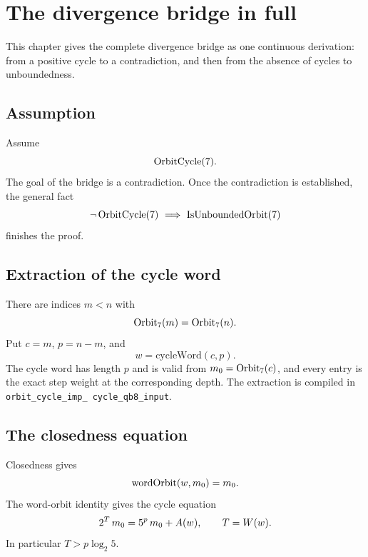 \section{The divergence bridge in full}

This chapter gives the complete divergence bridge as one continuous
derivation: from a positive cycle to a contradiction, and then from
the absence of cycles to unboundedness.

\subsection{Assumption}

Assume
\begin{equation*}
  \mathrm{OrbitCycle}(7).
\end{equation*}
The goal of the bridge is a contradiction.  Once the contradiction is
established, the general fact
\begin{equation*}
  \neg\,\OrbitCycle(7)\ \Longrightarrow\ \mathrm{IsUnboundedOrbit}(7)
\end{equation*}
finishes the proof.

\subsection{Extraction of the cycle word}

There are indices $m<n$ with
\begin{equation*}
  \mathrm{Orbit}_7(m)=\mathrm{Orbit}_7(n).
\end{equation*}
Put $c=m$, $p=n-m$, and
\begin{equation*}
  w=\mathrm{cycleWord}(c,p).
\end{equation*}
The cycle word has length $p$ and is valid from $m_0=\mathrm{Orbit}_7(c)$,
and every entry is the exact step weight at the corresponding depth.
The extraction is compiled in
\texttt{orbit\_\allowbreak cycle\_\allowbreak imp\_\allowbreak
cycle\_\allowbreak qb8\_\allowbreak input}.

\subsection{The closedness equation}

Closedness gives
\begin{equation*}
  \mathrm{wordOrbit}(w,m_0)=m_0.
\end{equation*}
The word-orbit identity gives the cycle equation
\begin{equation*}
  2^T\,m_0=5^p\,m_0+A(w),
  \qquad T=W(w).
\end{equation*}
In particular $T>p\log_2 5$.

